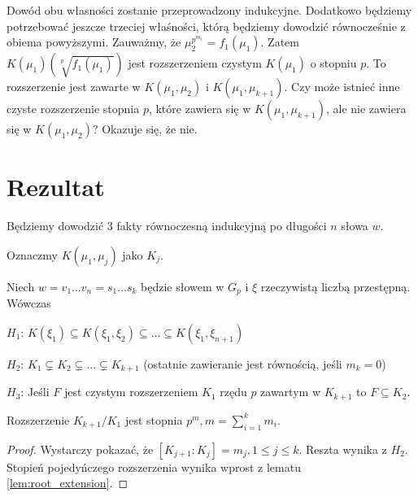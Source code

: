 Dowód obu własności zostanie przeprowadzony indukcyjne. Dodatkowo będziemy
potrzebować jeszcze trzeciej właśności, którą będziemy dowodzić równocześnie z
obiema powyższymi. Zauważmy, że $\mu_2^{p^{m_1}} = f_1\left(\mu_1\right)$.
Zatem $K\left(\mu_1\right)\left(\sqrt[p]{f_1\left(\mu_1\right)}\right)$ jest
rozszerzeniem czystym $K\left(\mu_1\right)$ o stopniu $p$.
To rozszerzenie jest zawarte w $K\left(\mu_1, \mu_2\right)$ i
$K\left(\mu_1, \mu_{k+1}\right)$.
Czy może istnieć inne czyste rozszerzenie stopnia $p$, które zawiera się w
$K\left(\mu_1, \mu_{k+1}\right)$, ale nie zawiera się w $K\left(\mu_1,
\mu_2\right)$? Okazuje się, że nie.

\section{Rezultat}

Będziemy dowodzić 3 fakty równoczesną indukcyjną po długości $n$ słowa $w$.

Oznaczmy $K\left(\mu_1, \mu_j\right)$ jako $K_j$.

\begin{theorem}
  Niech $w = v_1 \ldots v_n = s_1 \ldots s_k$ będzie słowem w $G_p$ i $\xi$
  rzeczywistą liczbą przestępną. Wówczas

  \begin{description}
    \item{$H_1$:}
      $K\left(\xi_1\right)\subseteq
      K\left(\xi_1, \xi_2\right)\subseteq
      \ldots \subseteq
      K\left(\xi_1, \xi_{n+1}\right)$
    \item{$H_2$:}
      $K_1 \subsetneq K_2 \subsetneq \ldots \subsetneq K_{k+1}$ (ostatnie zawieranie jest
      równością, jeśli $m_k = 0$)
    \item{$H_3$:}
      Jeśli $F$ jest czystym rozszerzeniem $K_1$ rzędu $p$  zawartym w $K_{k+1}$
      to $F \subseteq K_2$.
  \end{description}
  \label{th:hypothesis_h}
\end{theorem}

\begin{corollary}
  Rozszerzenie $K_{k+1}/K_1$ jest stopnia $p^m, m = \sum_{i=1}^k m_i$.
\end{corollary}

\begin{proof}
  Wystarczy pokazać, że $\left[K_{j + 1} : K_j\right]
  = m_j, 1 \leq j \leq k$. Reszta wynika z $H_2$.  Stopień pojedyńczego
  rozszerzenia wynika wprost z lematu \ref{lem:root_extension}.
\end{proof}

